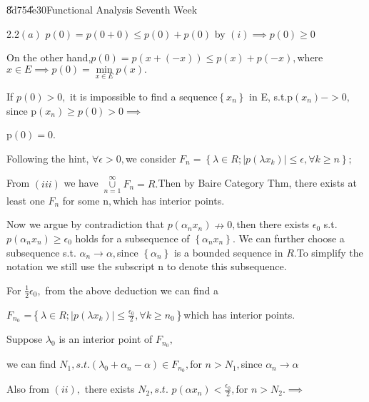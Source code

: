 \documentclass{article}
\begin{document}
\bigskip \bigskip \U{8d75}\U{4e30}\qquad \qquad Functional
Analysis Seventh Week

2.2$\left( a\right) $ $p\left( 0\right) =p\left( 0+0\right) \leq p\left(
0\right) +p\left( 0\right) $ by $\left( i\right) \implies p\left( 0\right)
\geq 0$

On the other hand,$p\left( 0\right) =p\left( x+\left( -x\right) \right) \leq
p\left( x\right) +p\left( -x\right) ,$where $x\in E\implies p\left( 0\right)
=\underset{x\in E}{\min }p\left( x\right) .$

If $p\left( 0\right) >0,$ it is impossible to find a sequence$\left\{
x_{n}\right\} $ in E, s.t.p$\left( x_{n}\right) ->0,$since p$\left(
x_{n}\right) \geq p\left( 0\right) >0\implies $

p$\left( 0\right) =0.$

Following the hint, $\forall \epsilon >0,$we consider $F_{n}=\left\{ \lambda
\in R;\left\vert p\left( \lambda x_{k}\right) \right\vert \leq \epsilon
,\forall k\geq n\right\} ;$

From $\left( iii\right) $ we have $\underset{n=1}{\overset{\infty }{\cup }}%
F_{n}=R.$Then by Baire Category Thm, there exists at least one $F_{n}$ for
some n$,$which has interior points.

\bigskip Now we argue by contradiction that $p\left( \alpha _{n}x_{n}\right)
\nrightarrow 0,$then there exists $\epsilon _{0}$ s.t. $p\left( \alpha
_{n}x_{n}\right) \geq \epsilon _{0}$ holds for a subsequence of $\left\{
\alpha _{n}x_{n}\right\} .$ We can further choose a subsequence s.t. $\alpha
_{n}\rightarrow \alpha ,$since $\left\{ \alpha _{n}\right\} $ is a bounded
sequence in $R.$To simplify the notation we still use the subscript n to
denote this subsequence.

For $\frac{1}{2}\epsilon _{0},$ from the above deduction we can find a 

$F_{n_{0}}$ =$\left\{ \lambda \in R;\left\vert p\left( \lambda x_{k}\right)
\right\vert \leq \frac{\epsilon _{0}}{2},\forall k\geq n_{0}\right\} $which
has interior points.

Suppose $\lambda _{0}$ is an interior point of $F_{n_{0}},$ 

we can find $N_{1},s.t.\left( \lambda _{0}+\alpha _{n}-\alpha \right) \in
F_{n_{0}},$for $n>N_{1},$since  $\alpha _{n}\rightarrow \alpha $

Also from $\left( ii\right) ,$ there exists $N_{2},s.t.$ $p\left( \alpha
x_{n}\right) <\frac{\epsilon _{0}}{2},$for $n>N_{2}.\implies $
\end{document}
